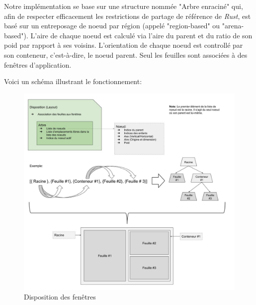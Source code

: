 \documentclass[titlepage]{article}
\begin{document}
\par
Notre implémentation se base sur une structure nommée "Arbre enraciné" qui, afin de respecter efficacement les restrictions de partage de référence de \textit{Rust}, est basé sur un entreposage de noeud par région (appelé "region-based" ou "arena-based"). L'aire de chaque noeud est calculé via l'aire du parent et du ratio de son poid par rapport à ses voisins. L'orientation de chaque noeud est controllé par son conteneur, c'est-à-dire, le noeud parent. Seul les feuilles sont associées à des fenêtres d'application.
\bigskip

Voici un schéma illustrant le fonctionnement:

\begin{figure}[H]
	\centering
	\includegraphics[width=\textwidth]{arbre_de_disposition.jpg}
	\caption{Disposition des fenêtres}
\end{figure}
\end{document}
